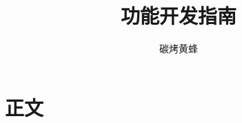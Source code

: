 \documentclass[chinese]{svmono}
\begin{document}
    \title{功能开发指南}
    \author{碳烤黄蜂}
    \maketitle

    \tableofcontents

    \frontmatter
    

    \mainmatter
    \chapter[正文]{正文}\label{ch:正文}
    
    
\end{document}
